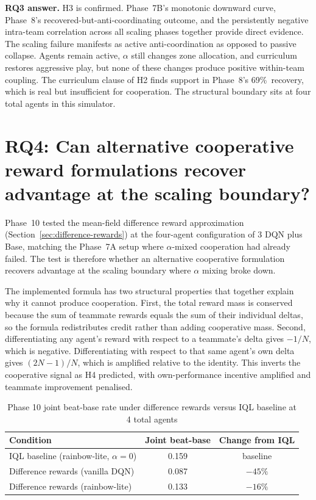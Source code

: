 \textbf{RQ3 answer.} H3 is confirmed. Phase~7B's monotonic downward curve, Phase~8's recovered-but-anti-coordinating outcome, and the persistently negative intra-team correlation across all scaling phases together provide direct evidence. The scaling failure manifests as active anti-coordination as opposed to passive collapse. Agents remain active, $\alpha$ still changes zone allocation, and curriculum restores aggressive play, but none of these changes produce positive within-team coupling. The curriculum clause of H2 finds support in Phase~8's 69\%\ recovery, which is real but insufficient for cooperation. The structural boundary sits at four total agents in this simulator.

\section{RQ4: Can alternative cooperative reward formulations recover advantage at the scaling boundary?}
\label{sec:rq4}

Phase~10 tested the mean-field difference reward approximation (Section~\ref{sec:difference-rewards}) at the four-agent configuration of 3 DQN plus Base, matching the Phase~7A setup where $\alpha$-mixed cooperation had already failed. The test is therefore whether an alternative cooperative formulation recovers advantage at the scaling boundary where $\alpha$ mixing broke down.

The implemented formula has two structural properties that together explain why it cannot produce cooperation. First, the total reward mass is conserved because the sum of teammate rewards equals the sum of their individual deltas, so the formula redistributes credit rather than adding cooperative mass. Second, differentiating any agent's reward with respect to a teammate's delta gives $-1/N$, which is negative. Differentiating with respect to that same agent's own delta gives $(2N-1)/N$, which is amplified relative to the identity. This inverts the cooperative signal as H4 predicted, with own-performance incentive amplified and teammate improvement penalised.

\begin{table}[htbp]
\centering
\small
\caption{Phase 10 joint beat-base rate under difference rewards versus IQL baseline at 4 total agents}
\label{tab:phase10-results}
\begin{tabular}{|l|c|c|}
\hline
\textbf{Condition} & \textbf{Joint beat-base} & \textbf{Change from IQL} \\
\hline
IQL baseline (rainbow-lite, $\alpha=0$) & 0.159 & baseline \\
Difference rewards (vanilla DQN)        & 0.087 & $-45\%$ \\
Difference rewards (rainbow-lite)       & 0.133 & $-16\%$ \\
\hline
\end{tabular}
\end{table}


